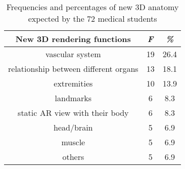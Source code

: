 \begin{table}
	\caption[3D anatomy expected]{Frequencies and percentages of new 3D anatomy expected by the 72 medical students}
	\centering
	\label{tb:3-MMC:question5}
	\scriptsize
	\begin{center}
		\begin{tabular}{ccc}
			New 3D rendering functions & \textit{F} & \textit{\%} \\
			\hline
			vascular system &	19 &	26.4 \\
			relationship between different organs&	13	&18.1\\
			extremities &	10&	13.9\\
			landmarks&	6&	8.3\\
			static AR view with their body&	6	&8.3\\
			head/brain	&5	&6.9\\
			muscle&	5&	6.9\\
			others&	5&	6.9\\
			\hline
		\end{tabular}
	\end{center}
\end{table}